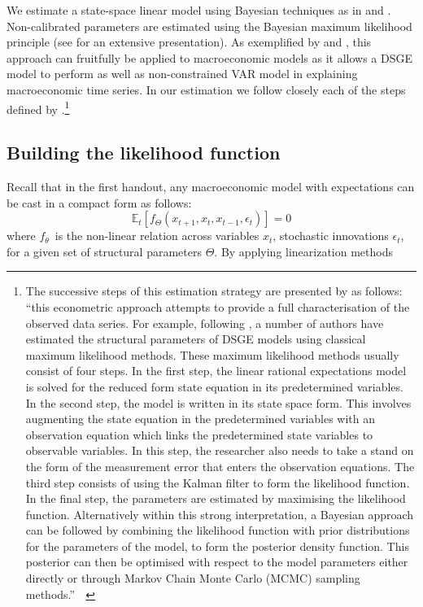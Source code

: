 \documentclass[a4paper,12pt]{article}%
\begin{document}
We estimate a state-space linear model using Bayesian techniques as in
\cite{fernandez2004comparing} and \cite{smets2007shocks}. Non-calibrated
parameters are estimated using the Bayesian maximum likelihood principle (see
\cite{an2007bayesian} for an extensive presentation). As exemplified by
\cite{smets2003estimated} and \cite{smets2007shocks}, this approach can
fruitfully be applied to macroeconomic models as it allows a DSGE model to
perform as well as non-constrained VAR model in explaining macroeconomic time
series. In our estimation we follow closely each of the steps defined by
\cite{smets2003estimated}.\footnote{The successive steps of this estimation
strategy are presented by \cite{smets2003estimated} as follows:
\textquotedblleft this econometric approach attempts to provide a full
characterisation of the observed data series. For example, following
\cite{sargent1989two}, a number of authors have estimated the structural
parameters of DSGE models using classical maximum likelihood methods. These
maximum likelihood methods usually consist of four steps. In the first step,
the linear rational expectations model is solved for the reduced form state
equation in its predetermined variables. In the second step, the model is
written in its state space form. This involves augmenting the state equation
in the predetermined variables with an observation equation which links the
predetermined state variables to observable variables. In this step, the
researcher also needs to take a stand on the form of the measurement error
that enters the observation equations. The third step consists of using the
Kalman filter to form the likelihood function. In the final step, the
parameters are estimated by maximising the likelihood function. Alternatively
within this strong interpretation, a Bayesian approach can be followed by
combining the likelihood function with prior distributions for the parameters
of the model, to form the posterior density function. This posterior can then
be optimised with respect to the model parameters either directly or through
Markov Chain Monte Carlo (MCMC) sampling methods.\textquotedblright\ $\ \ $}

\subsection{Building the likelihood function}

Recall that in the first handout, any macroeconomic model with expectations
can be cast in a compact form as follows:%
\begin{equation}
\mathbb{E}_{t}\left[  f_{\Theta}\left(  x_{t+1},x_{t},x_{t-1},\epsilon
_{t}\right)  \right]  =0 \label{eq non linear system}%
\end{equation}
where $f_{\theta}$\ is the non-linear relation across variables $x_{t}$,
stochastic innovations $\epsilon_{t}$, for a given set of structural
parameters $\Theta$. By applying linearization methods
\end{document}
